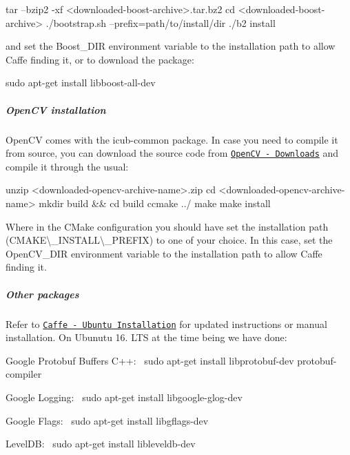 \begin{DoxyCode}
tar --bzip2 -xf <downloaded-boost-archive>.tar.bz2
cd <downloaded-boost-archive>
./bootstrap.sh --prefix=path/to/install/dir
./b2 install
\end{DoxyCode}
 and set the {\ttfamily Boost\+\_\+\+D\+IR} environment variable to the installation path to allow Caffe finding it, or to download the package\+:


\begin{DoxyCode}
sudo apt-get install libboost-all-dev
\end{DoxyCode}


\subparagraph*{Open\+CV installation}

Open\+CV comes with the {\ttfamily icub-\/common} package. In case you need to compile it from source, you can download the source code from \href{http://opencv.org/downloads.html}{\tt Open\+CV -\/ Downloads} and compile it through the usual\+:


\begin{DoxyCode}
unzip <downloaded-opencv-archive-name>.zip
cd <downloaded-opencv-archive-name>
mkdir build && cd build
ccmake ../
make
make install
\end{DoxyCode}


Where in the C\+Make configuration you should have set the installation path ({\ttfamily C\+M\+A\+KE\textbackslash{}\+\_\+\+I\+N\+S\+T\+A\+LL\textbackslash{}\+\_\+\+P\+R\+E\+F\+IX}) to one of your choice. In this case, set the {\ttfamily Open\+C\+V\+\_\+\+D\+IR} environment variable to the installation path to allow Caffe finding it.

\subparagraph*{Other packages}

Refer to \href{http://caffe.berkeleyvision.org/install_apt.html}{\tt Caffe -\/ Ubuntu Installation} for updated instructions or manual installation. On Ubunutu 16. L\+TS at the time being we have done\+:

Google Protobuf Buffers C++\+:~\newline
 {\ttfamily sudo apt-\/get install libprotobuf-\/dev protobuf-\/compiler}

Google Logging\+:~\newline
 {\ttfamily sudo apt-\/get install libgoogle-\/glog-\/dev}

Google Flags\+:~\newline
 {\ttfamily sudo apt-\/get install libgflags-\/dev}

Level\+DB\+:~\newline
 {\ttfamily sudo apt-\/get install libleveldb-\/dev}


